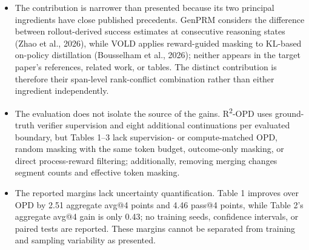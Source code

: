 \begin{itemize}
\item The contribution is narrower than presented because its two principal ingredients have close published precedents. GenPRM considers the difference between rollout-derived success estimates at consecutive reasoning states (Zhao et al., 2026), while VOLD applies reward-guided masking to KL-based on-policy distillation (Bousselham et al., 2026); neither appears in the target paper's references, related work, or tables. The distinct contribution is therefore their span-level rank-conflict combination rather than either ingredient independently.
\par{}
\begin{responsebox}[frametitle={Response to W4}]
\vspace*{2\baselineskip}
\end{responsebox}

\item The evaluation does not isolate the source of the gains. R\textsuperscript{2}-OPD uses ground-truth verifier supervision and eight additional continuations per evaluated boundary, but Tables 1--3 lack supervision- or compute-matched OPD, random masking with the same token budget, outcome-only masking, or direct process-reward filtering; additionally, removing merging changes segment counts and effective token masking.
\par{}
\begin{responsebox}[frametitle={Response to W5}]
\vspace*{2\baselineskip}
\end{responsebox}

\item The reported margins lack uncertainty quantification. Table 1 improves over OPD by 2.51 aggregate avg@4 points and 4.46 pass@4 points, while Table 2's aggregate avg@4 gain is only 0.43; no training seeds, confidence intervals, or paired tests are reported. These margins cannot be separated from training and sampling variability as presented.
\par{}
\begin{responsebox}[frametitle={Response to W6}]
\vspace*{2\baselineskip}
\end{responsebox}

\end{itemize}

